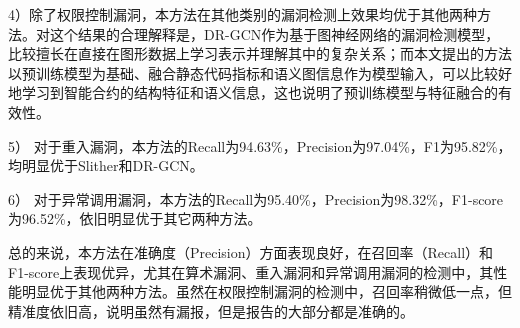 4）除了权限控制漏洞，本方法在其他类别的漏洞检测上效果均优于其他两种方法。对这个结果的合理解释是，DR-GCN作为基于图神经网络的漏洞检测模型，比较擅长在直接在图形数据上学习表示并理解其中的复杂关系；而本文提出的方法以预训练模型为基础、融合静态代码指标和语义图信息作为模型输入，可以比较好地学习到智能合约的结构特征和语义信息，这也说明了预训练模型与特征融合的有效性。

5） 对于重入漏洞，本方法的Recall为94.63\%，Precision为97.04\%，F1为95.82\%，均明显优于Slither和DR-GCN。

6） 对于异常调用漏洞，本方法的Recall为95.40\%，Precision为98.32\%，F1-score为96.52\%，依旧明显优于其它两种方法。

总的来说，本方法在准确度（Precision）方面表现良好，在召回率（Recall）和F1-score上表现优异，尤其在算术漏洞、重入漏洞和异常调用漏洞的检测中，其性能明显优于其他两种方法。虽然在权限控制漏洞的检测中，召回率稍微低一点，但精准度依旧高，说明虽然有漏报，但是报告的大部分都是准确的。

